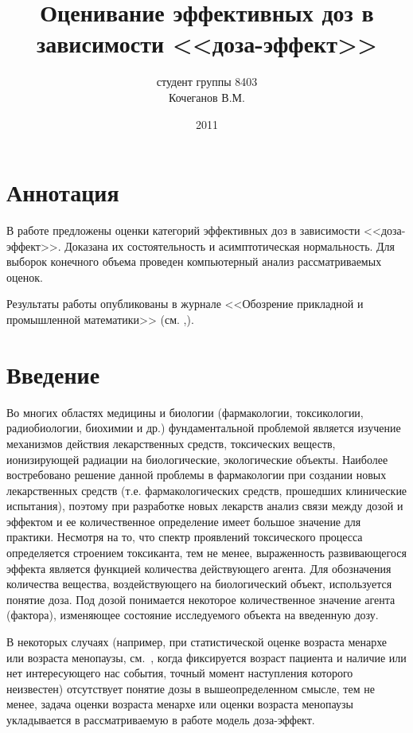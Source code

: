 \documentclass[a4paper,14pt,russian]{article}
\title{Оценивание эффективных доз в зависимости <<доза-эффект>>}
\author{студент группы 8403 \\ Кочеганов В.М.}
\date{2011}
\begin{document}
\maketitle
{}
\tableofcontents

\newpage

\section*{Аннотация}
%
В работе предложены оценки категорий эффективных доз в зависимости <<доза-эффект>>. Доказана их состоятельность и асимптотическая нормальность. Для выборок конечного объема проведен компьютерный анализ рассматриваемых оценок.

Результаты работы опубликованы в журнале <<Обозрение прикладной и промышленной математики>> (см. \cite{Kocheganov1},\cite{Kocheganov2}).
\newpage
\section*{Введение}

Во многих областях медицины и биологии (фармакологии, токсикологии, радиобиологии, биохимии и др.) фундаментальной проблемой является изучение механизмов действия лекарственных средств, токсических веществ, ионизирующей радиации на биологические, экологические объекты. Наиболее востребовано решение данной проблемы в фармакологии при создании новых лекарственных средств (т.е. фармакологических средств, прошедших клинические испытания), поэтому при разработке новых лекарств анализ связи между дозой и эффектом и ее количественное определение имеет большое значение для практики. Несмотря на то, что спектр проявлений токсического процесса определяется строением токсиканта, тем не менее, выраженность развивающегося эффекта является функцией количества действующего агента. Для обозначения количества вещества, воздействующего на биологический объект, используется понятие доза. Под дозой понимается некоторое количественное значение агента (фактора), изменяющее состояние исследуемого объекта на введенную дозу.

В некоторых случаях (например, при статистической оценке возраста менархе или возраста менопаузы, см.~\cite{Fin}, когда фиксируется возраст пациента и наличие или нет интересующего нас события, точный момент наступления которого неизвестен) отсутствует понятие дозы в вышеопределенном смысле, тем не менее, задача оценки возраста менархе или оценки возраста менопаузы укладывается в рассматриваемую в работе модель доза-эффект.
\end{document}
